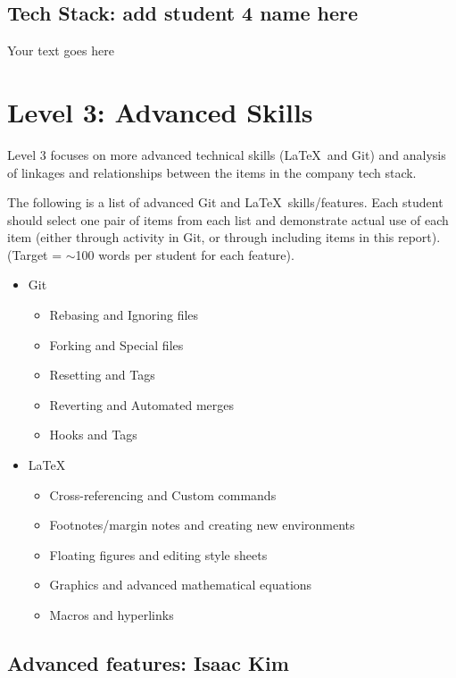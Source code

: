 \documentclass[a4paper, 11pt]{report}
\begin{document}
\subsection{Tech Stack: add student 4 name here}

Your text goes here



\newpage
\section{Level 3: Advanced Skills}

Level 3 focuses on more advanced technical skills (\LaTeX\ and Git) and analysis of linkages and relationships between the items in the company tech stack.

The following is a list of advanced Git and \LaTeX\ skills/features. Each student should select one pair of items from each list and demonstrate actual use of each item (either through activity in Git, or through including items in this report). (Target = $\sim$100 words per student for each feature).
\begin{itemize}
    \item Git
    \begin{itemize}
        \item Rebasing and Ignoring files
        \item Forking and Special files
        \item Resetting and Tags
        \item Reverting and Automated merges
        \item Hooks and Tags
    \end{itemize}
    \item \LaTeX\ 
    \begin{itemize}
        \item Cross-referencing and Custom commands
        \item Footnotes/margin notes and creating new environments
        \item Floating figures and editing style sheets
        \item Graphics and advanced mathematical equations
        \item Macros and hyperlinks
    \end{itemize}
\end{itemize}

\subsection{Advanced features: Isaac Kim}
\end{document}
